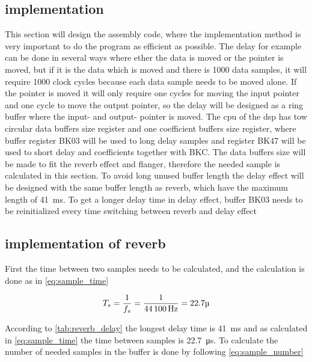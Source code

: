 \subsection{implementation}
This section will design the assembly code, where the implementation method is very important to do the program as efficient as possible. The delay for example can be done in several ways where ether the data is moved or the pointer is moved, but if it is the data which is moved and there is 1000 data samples, it will require 1000 clock cycles because each data sample needs to be moved alone. If the pointer is moved it will only require one cycles for moving the input pointer and one cycle to move the output pointer, so the delay will be designed as a ring buffer where the input- and output- pointer is moved. 
The \gls{cpu} of the \gls{dsp} has tow circular data buffers size register and one coefficient buffers size register, where buffer register BK03 will be used to long delay samples and register BK47 will be used to short delay and coefficients together with BKC. The data buffers size will be made to fit the \gls{reverb} effect and flanger, therefore the needed sample is calculated in this section. To avoid long unused buffer length the delay effect will be designed with the same buffer length as \gls{reverb}, which have the maximum length of \SI{41}{\milli\second}. To get a longer delay time in delay effect, buffer BK03 needs to be reinitialized every time switching between \gls{reverb} and delay effect


\subsection{implementation of \gls{reverb}}
 First the time between two samples needs to be calculated, and the calculation is done as in \autoref{eq:sample_time}

    \begin{equation}\label{eq:sample_time}
T_s=\frac{1}{f_s} = \frac{1}{\SI{44100}{\hertz}} = 22.7\micro \addunit{\SI{}{\second}}
    \end{equation}

\startexplain
{}
    \stopexplain


According to \autoref{tab:reverb_delay} the longest delay time is \SI{41}{\milli\second} and as calculated in \autoref{eq:sample_time} the time between samples is \SI{22.7}{\micro\second}. To calculate the number of needed samples in the buffer is done by following \autoref{eq:sample_number}

